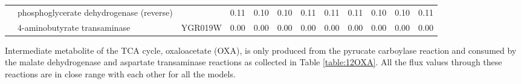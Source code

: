 \begin{table}[H]
{\begin{tabular}{clcccccccccc}
                        & phosphoglycerate dehydrogenase (reverse)                                                      &                                                           & 0.11      & 0.10      & 0.10     & 0.11                                                          & 0.11 & 0.11   & 0.10                                                      & 0.10   & 0.11     \\
                        & 4-aminobutyrate transaminase                                                                  & YGR019W                                                   & 0.00      & 0.00      & 0.00     & 0.00                                                          & 0.00 & 0.00   & 0.00                                                      & 0.00   & 0.00     \\ \hline
\end{tabular}}
\label{table:122KG}
\end{table}

Intermediate metabolite of the TCA cycle, oxaloacetate (OXA), is only produced from the pyrucate carboylase reaction and consumed by the malate dehydrogenase and aspartate transaminase reactions as collected in Table \ref{table:12OXA}. All the flux values through these reactions are in close range with each other for all the models.

